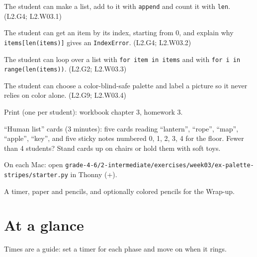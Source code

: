 
\begin{objectives}
  \item The student can make a list, add to it with \texttt{append} and count it with \texttt{len}. (L2.G4; L2.W03.1)
  \item The student can get an item by its index, starting from 0, and explain why \texttt{items[len(items)]} gives an \texttt{IndexError}. (L2.G4; L2.W03.2)
  \item The student can loop over a list with \texttt{for item in items} and with \texttt{for i in range(len(items))}. (L2.G2; L2.W03.3)
  \item The student can choose a color-blind-safe palette and label a picture so it never relies on color alone. (L2.G9; L2.W03.4)
\end{objectives}

\begin{materials}
  \item Print (one per student): workbook chapter 3, homework 3.
  \item \enquote{Human list} cards (3 minutes): five cards reading \enquote{lantern}, \enquote{rope}, \enquote{map}, \enquote{apple}, \enquote{key},
        and five sticky notes numbered 0, 1, 2, 3, 4 for the floor. Fewer than 4 students? Stand cards up on chairs or hold them with soft toys.
  \item On each Mac: open \texttt{grade-4-6/2-intermediate/exercises/week03/ex-palette-stripes/starter.py} in Thonny (+).
  \item A timer, paper and pencils, and optionally colored pencils for the Wrap-up.
\end{materials}

\section{At a glance}
Times are a guide: set a timer for each phase and move on when it rings.
\begin{timeplan}
\end{timeplan}

